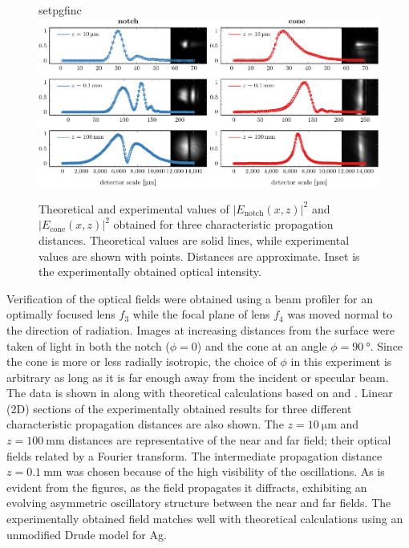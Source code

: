 \begin{figure}[ht]
 \centering
 {setpgfinc}
 \includegraphics[width=16cm,keepaspectratio]{interference/figures/fig2-crop.pdf}
	\caption{ Theoretical and experimental values of
$|E_\text{notch}(x,z)|^2$ and $|E_\text{cone}(x,z)|^2$ obtained for three
characteristic propagation distances.  Theoretical values are solid lines,
while experimental values are shown with points.  Distances are
approximate.  Inset is the experimentally obtained optical intensity.}
\label{fig:fresnelprop}
\end{figure}
Verification of the optical fields were obtained using a beam profiler for
an optimally focused lens $f_3$ while the focal plane of lens $f_4$ was moved normal
to the direction of radiation.  Images at increasing distances from the
surface were taken of light in both the notch
($\phi=0$) and the cone at an angle $\phi = \SI{90}{\degree}$.  Since the
cone is more or less radially isotropic, the choice of $\phi$ in this
experiment is arbitrary as long as it is far enough away from the incident
or specular beam.  The data is shown in  along with 
theoretical calculations based on  and
. Linear (2D) sections of the experimentally obtained results for
three different characteristic propagation distances are also shown.  
The $z=\SI{10}{\micro\meter}$ and $z=\SI{100}{\milli\meter}$ distances
are representative of the near and far field; their optical fields 
related by a Fourier transform.  The intermediate propagation
distance $z=\SI{0.1}{\milli\meter}$ was chosen because of the high visibility of the oscillations.  As is evident from the figures, as the field propagates it
diffracts, exhibiting an evolving asymmetric oscillatory structure between
the near and far fields.  The experimentally obtained field matches well with
theoretical calculations using an unmodified Drude model for Ag.

